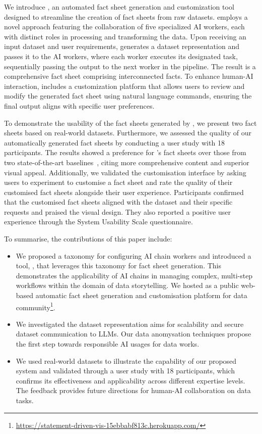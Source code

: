 We introduce \tool, an automated fact sheet generation and customization tool designed to streamline the creation of fact sheets from raw datasets. \tool employs a novel approach featuring the collaboration of five specialized AI workers, each with distinct roles in processing and transforming the data. Upon receiving an input dataset and user requirements, \tool generates a dataset representation and passes it to the AI workers, where each worker executes its designated task, sequentially passing the output to the next worker in the pipeline. The result is a comprehensive fact sheet comprising interconnected facts. To enhance human-AI interaction, \tool includes a customization platform that allows users to review and modify the generated fact sheet using natural language commands, ensuring the final output aligns with specific user preferences.


To demonstrate the usability of the fact sheets generated by \tool, we present two fact sheets based on real-world datasets. Furthermore, we assessed the quality of our automatically generated fact sheets by conducting a user study with 18 participants. The results showed a preference for \tool's fact sheets over those from two state-of-the-art baselines~\cite{shi2020calliope, openai_2023}, citing more comprehensive content and superior visual appeal. Additionally, we validated the customisation interface by asking users to experiment \tool to customise a fact sheet and rate the quality of their customised fact sheets alongside their user experience. Participants confirmed that the customised fact sheets aligned with the dataset and their specific requests and praised the visual design. They also reported a positive user experience through the System Usability Scale questionnaire.


To summarise, the contributions of this paper include:
\begin{itemize}
\item We proposed a taxonomy for configuring AI chain workers and introduced a tool, \tool, that leverages this taxonomy for fact sheet generation. This demonstrates the applicability of AI chains in managing complex, multi-step workflows within the domain of data storytelling.
We hosted \tool as a public web-based automatic fact sheet generation and customisation platform for data community\footnote{\url{https://statement-driven-vis-15ebbabf813c.herokuapp.com/}}. 
\item We investigated the dataset representation aims for scalability and secure dataset communication to LLMs. Our data anomysation techniques propose the first step towards responsible AI usages for data works.
\item We used real-world datasets to illustrate the capability of our proposed system and validated \tool through a user study with 18 participants, which confirms its effectiveness and applicability across different expertise levels. The feedback provides future directions for human-AI collaboration on data tasks.
\end{itemize}
